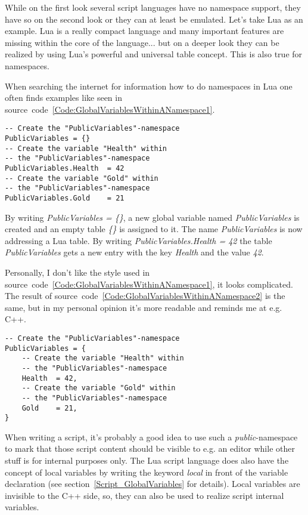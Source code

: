 While on the first look several script languages have no namespace support, they have so on the second look or they can at least be emulated. Let's take Lua as an example. Lua is a really compact language and many important features are missing within the core of the language... but on a deeper look they can be realized by using Lua's powerful and universal table concept. This is also true for namespaces.

When searching the internet for information how to do namespaces in Lua one often finds examples like seen in source~code~\ref{Code:GlobalVariablesWithinANamespace1}.
\begin{lstlisting}[float=htb,label=Code:GlobalVariablesWithinANamespace1,caption={Global variables within a namespace (1)}]
-- Create the "PublicVariables"-namespace
PublicVariables = {}
-- Create the variable "Health" within
-- the "PublicVariables"-namespace
PublicVariables.Health	= 42
-- Create the variable "Gold" within
-- the "PublicVariables"-namespace
PublicVariables.Gold	= 21
\end{lstlisting}
By writing \emph{PublicVariables = \{\}}, a new global variable named \emph{PublicVariables} is created and an empty table \emph{\{\}} is assigned to it. The name \emph{PublicVariables} is now addressing a Lua table. By writing \emph{PublicVariables.Health = 42} the table \emph{PublicVariables} gets a new entry with the key \emph{Health} and the value \emph{42}.

Personally, I don't like the style used in source~code~\ref{Code:GlobalVariablesWithinANamespace1}, it looks complicated. The result of source~code~\ref{Code:GlobalVariablesWithinANamespace2} is the same, but in my personal opinion it's more readable and reminds me at e.g. C++.
\begin{lstlisting}[float=htb,label=Code:GlobalVariablesWithinANamespace2,caption={Global variables within a namespace (2)}]
-- Create the "PublicVariables"-namespace
PublicVariables = {
	-- Create the variable "Health" within
	-- the "PublicVariables"-namespace
	Health	= 42,
	-- Create the variable "Gold" within
	-- the "PublicVariables"-namespace
	Gold	= 21,
}
\end{lstlisting}

When writing a script, it's probably a good idea to use such a \emph{public}-namespace to mark that those script content should be visible to e.g. an editor while other stuff is for internal purposes only. The Lua script language does also have the concept of local variables by writing the keyword \emph{local} in front of the variable declaration (see section~\ref{Script_GlobalVariables} for details). Local variables are invisible to the C++ side, so, they can also be used to realize script internal variables.


